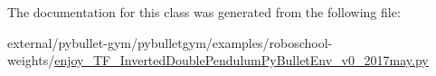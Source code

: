 The documentation for this class was generated from the following file\+:\begin{DoxyCompactItemize}
\item 
external/pybullet-\/gym/pybulletgym/examples/roboschool-\/weights/\hyperlink{enjoy___t_f___inverted_double_pendulum_py_bullet_env__v0__2017may_8py}{enjoy\+\_\+\+T\+F\+\_\+\+Inverted\+Double\+Pendulum\+Py\+Bullet\+Env\+\_\+v0\+\_\+2017may.\+py}\end{DoxyCompactItemize}
